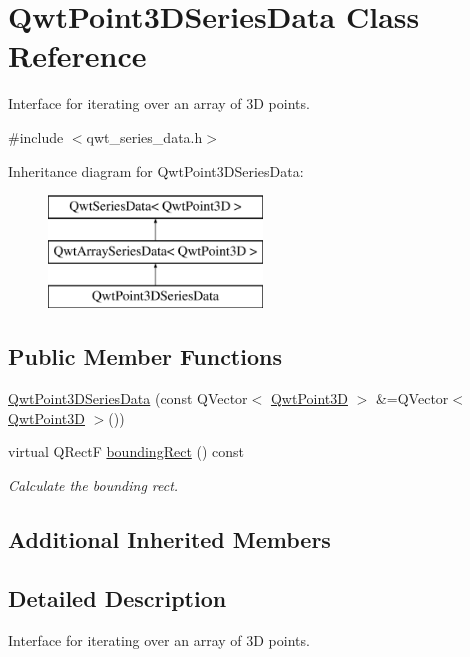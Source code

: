 \hypertarget{class_qwt_point3_d_series_data}{\section{Qwt\-Point3\-D\-Series\-Data Class Reference}
\label{class_qwt_point3_d_series_data}
}


Interface for iterating over an array of 3\-D points.  




{\ttfamily \#include $<$qwt\-\_\-series\-\_\-data.\-h$>$}

Inheritance diagram for Qwt\-Point3\-D\-Series\-Data\-:\begin{figure}[H]
\begin{center}
\leavevmode
\includegraphics[height=3.000000cm]{class_qwt_point3_d_series_data}
\end{center}
\end{figure}
\subsection*{Public Member Functions}
\begin{DoxyCompactItemize}
\item 
\hyperlink{class_qwt_point3_d_series_data_a4410e3dea4acccfdde70eb1f99829c16}{Qwt\-Point3\-D\-Series\-Data} (const Q\-Vector$<$ \hyperlink{class_qwt_point3_d}{Qwt\-Point3\-D} $>$ \&=Q\-Vector$<$ \hyperlink{class_qwt_point3_d}{Qwt\-Point3\-D} $>$())
\item 
virtual Q\-Rect\-F \hyperlink{class_qwt_point3_d_series_data_a94ea1834516a2a484712723b5c9625ca}{bounding\-Rect} () const 
\begin{DoxyCompactList}\small\item\em Calculate the bounding rect. \end{DoxyCompactList}\end{DoxyCompactItemize}
\subsection*{Additional Inherited Members}


\subsection{Detailed Description}
Interface for iterating over an array of 3\-D points. 

